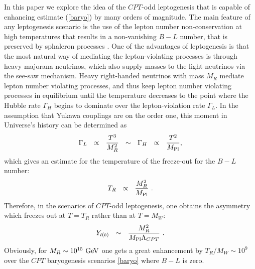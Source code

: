 \documentclass[12pt]{revtex4}
\newcommand{\Mpl}{M_{\rm Pl}}
\newcommand{\Tsph}{T_{\rm sph}}
\newcommand{\GeV}{{\rm GeV}}
\begin{document}

    In this paper we explore the idea of the $CPT$-odd leptogenesis that is capable of 
    enhancing estimate (\ref{baryo}) by many orders of magnitude. 
    The main feature of any leptogenesis scenario is the use of the lepton number non-conservation 
    at high temperatures that results in a non-vanishing $ B - L $ 
    number, that is preserved by sphaleron processes \cite{Fukugita:1986hr}. 
	One of the advantages of leptogenesis is that the most natural way of mediating
the lepton-violating processes is through
	heavy majorana neutrinos, which also supply masses to the light neutrinos
	via the see-saw mechanism. 
	Heavy right-handed neutrinos with mass $ M_R $ mediate lepton number violating processes, 
	and thus keep lepton number violating processes in equilibrium 
until the temperature decreases to the point where the Hubble rate $ \Gamma_H $ begins to dominate
over the lepton-violation rate $ \Gamma_L $.
	In the assumption that Yukawa couplings are on the order one, this moment in Universe's 
	history can be determined as 
\[
	\Gamma_L ~~\propto~~ \frac{T^3}{M_R^2} ~~\sim~~ \Gamma_H ~~\propto~~ \frac{T^2}{\Mpl},
\]
	which gives an estimate for the temperature of the freeze-out for the $B-L$ number:
\[
	T_R ~~\propto~~ \frac{M_R^2}{\Mpl}~.
\]
	Therefore, in the scenarios of $CPT$-odd leptogenesis, one obtains the asymmetry
	which freezes out at $ T = T_R $ rather than at $ T = M_W $:
\[
	Y_{l(b)} ~~\sim~~ \frac{M_R^2}{\Mpl\Lambda_{CPT}}~.
\]
	Obviously, for 	$ M_R \sim 10^{15}~\GeV $ one gets a great enhancement 
	by $ T_R/M_W \sim 10^{9}$ over the $CPT$ baryogenesis scenarios  \eqref{baryo} where 
$B-L$ is zero.

\end{document}

